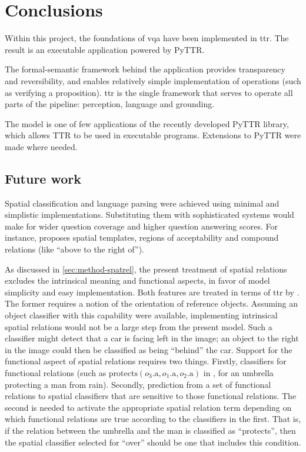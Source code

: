 \section{Conclusions}
\label{sec:conclusions}
\glsresetall

Within this project, the foundations of \gls{vqa} have been implemented in \gls{ttr}.
The result is an executable application powered by PyTTR.

The formal-semantic framework behind the application provides transparency and reversibility, and enables relatively simple implementation of operations (such as verifying a proposition).
\Gls{ttr} is the single framework that serves to operate all parts of the pipeline: perception, language and grounding.

The model is one of few applications of the recently developed PyTTR library, which allows TTR to be used in executable programs.
Extensions to PyTTR were made where needed.



\subsection{Future work}

Spatial classification and language parsing were achieved using minimal and simplistic implementations.
Substituting them with sophisticated systems would make for wider question coverage and higher question answering scores.
For instance, \cite{LoganComputationalAnalysisApprehension1996} proposes spatial templates, regions of acceptability and compound relations (like ``above to the right of'').

As discussed in \autoref{sec:method-spatrel}, the present treatment of spatial relations excludes the intrinsical meaning and functional aspects, in favor of model simplicity and easy implementation.
Both features are treated in terms of \gls{ttr} by \cite{ttrspat}.
The former requires a notion of the orientation of reference objects.
Assuming an object classifier with this capability were available, implementing intrinsical spatial relations would not be a large step from the present model.
Such a classifier might detect that a car is facing left in the image;
an object to the right in the image could then be classified as being ``behind'' the car.
Support for the functional aspect of spatial relations requires two things.
Firstly, classifiers for functional relations (such as $\text{protects}(o_3\text{.a}, o_1\text{.a}, o_2\text{.a})$ in \cite{ttrspat}, for an umbrella protecting a man from rain).
Secondly, prediction from a set of functional relations to spatial classifiers that are sensitive to those functional relations.
The second is needed to activate the appropriate spatial relation term depending on which functional relations are true according to the classifiers in the first.
That is, if the relation between the umbrella and the man is classified as ``protects'', then the spatial classifier selected for ``over'' should be one that includes this condition.

